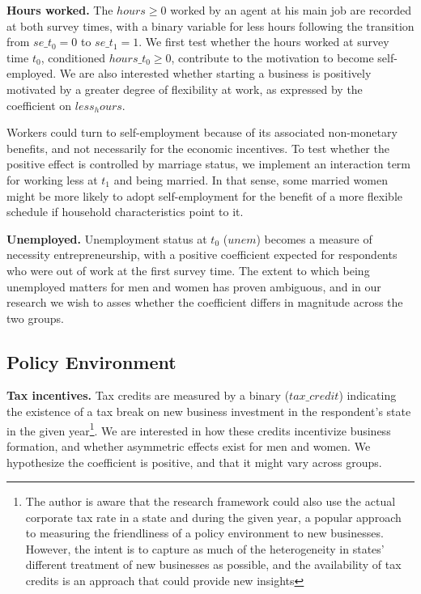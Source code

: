 \textbf{Hours worked.} The $hours \geq 0$ worked by an agent at his main job are recorded at both survey times, with a binary variable for less hours following the transition from $se\_t_0 = 0$ to $se\_t_1 = 1$. We first test whether the hours worked at survey time $t_0$, conditioned $hours\_t_0 \geq 0$, contribute to the motivation to become self-employed. We are also interested whether starting a business is positively motivated by a greater degree of flexibility at work, as expressed by the coefficient on $less_hours$. 

Workers could turn to self-employment because of its associated non-monetary benefits, and not necessarily for the economic incentives. To test whether the positive effect is controlled by marriage status, we implement an interaction term for working less at $t_1$ and being married. In that sense, some married women might be more likely to adopt self-employment for the benefit of a more flexible schedule if household characteristics point to it. 

\textbf{Unemployed.} Unemployment status at $t_0$ ($unem$) becomes a measure of necessity entrepreneurship, with a positive coefficient expected for respondents who were out of work at the first survey time. The extent to which being unemployed matters for men and women has proven ambiguous, and in our research we wish to asses whether the coefficient differs in magnitude across the two groups.


\subsection{Policy Environment}

\textbf{Tax incentives.} Tax credits are measured by a binary ($tax\_credit$) indicating the existence of a tax break on new business investment in the respondent's state in the given year\footnote{The author is aware that the research framework could also use the actual corporate tax rate in a state and during the given year, a popular approach to measuring the friendliness of a policy environment to new businesses. However, the intent is to capture as much of the heterogeneity in states' different treatment of new businesses as possible, and the availability of tax credits is an approach that could provide new insights}. We are interested in how these credits incentivize business formation, and whether asymmetric effects exist for men and women. We hypothesize the coefficient is positive, and that it might vary across groups.

